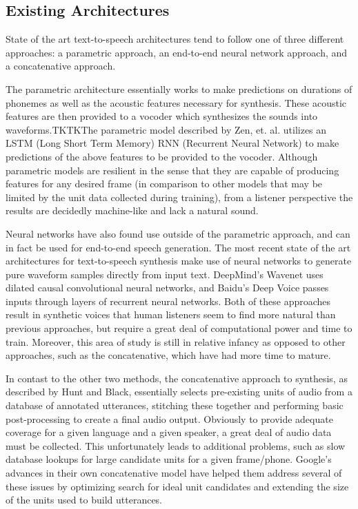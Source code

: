 \documentclass[10pt, journal, compsoc]{IEEEtran}
\begin{document}
\subsection{Existing Architectures}
State of the art text-to-speech architectures tend to follow one of three different approaches: a parametric approach, an end-to-end neural network approach, and a concatenative approach.\par
The parametric architecture essentially works to make predictions on durations of phonemes as well as the acoustic features necessary for synthesis. These acoustic features are then provided to a vocoder which synthesizes the sounds into waveforms.TKTKThe parametric model described by Zen, et. al. utilizes an LSTM (Long Short Term Memory) RNN (Recurrent Neural Network) to make predictions of the above features to be provided to the vocoder.\cite{DBLP:journals/corr/ZenAEHS16} Although parametric models are resilient in the sense that they are capable of producing features for any desired frame (in comparison to other models that may be limited by the unit data collected during training), from a listener perspective the results are decidedly machine-like and lack a natural sound.\par
Neural networks have also found use outside of the parametric approach, and can in fact be used for end-to-end speech generation. The most recent state of the art architectures for text-to-speech synthesis make use of neural networks to generate pure waveform samples directly from input text. DeepMind's Wavenet uses dilated causal convolutional neural networks\cite{DBLP:journals/corr/ArikCCDGKLMRSS17}, and Baidu's Deep Voice passes inputs through layers of recurrent neural networks. Both of these approaches result in synthetic voices that human listeners seem to find more natural than previous approaches\cite{DBLP:journals/corr/OordDZSVGKSK16}, but require a great deal of computational power and time to train. Moreover, this area of study is still in relative infancy as opposed to other approaches, such as the concatenative, which have had more time to mature.\par
In contast to the other two methods, the concatenative approach to synthesis, as described by Hunt and Black, essentially selects pre-existing units of audio from a database of annotated utterances, stitching these together and performing basic post-processing to create a final audio output\cite{Hunt:1996:USC:1256383.1256532}. Obviously to provide adequate coverage for a given language and a given speaker, a great deal of audio data must be collected. This unfortunately leads to additional problems, such as slow database lookups for large candidate units for a given frame/phone. Google's advances in their own concatenative model have helped them address several of these issues by optimizing search for ideal unit candidates and extending the size of the units used to build utterances.\cite{45564}\par
\end{document}
